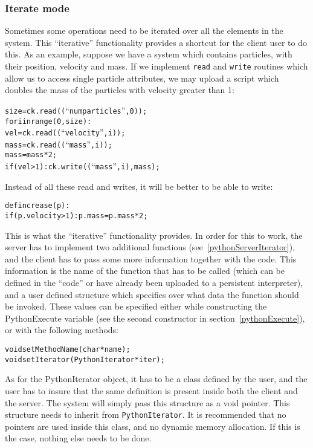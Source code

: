 \subsubsection{Iterate mode}

\label{pythonIterator}

Sometimes some operations need to be iterated over all the elements in the
system. This ``iterative'' functionality provides a shortcut for the client user
to do this. As an example, suppose we have a system which contains particles,
with their position, velocity and mass. If we implement \texttt{read} and
\texttt{write} routines which allow us to access single particle attributes, we may
upload a script which doubles the mass of the particles with velocity greater
than 1:

\begin{alltt}
size = ck.read((``numparticles'', 0));
for i in range(0, size):
    vel = ck.read((``velocity'', i));
    mass = ck.read((``mass'', i));
    mass = mass * 2;
    if (vel > 1): ck.write((``mass'', i), mass);
\end{alltt}

Instead of all these read and writes, it will be better to be able to write:

\begin{alltt}
def increase(p):
    if (p.velocity > 1): p.mass = p.mass * 2;
\end{alltt}

This is what the ``iterative'' functionality provides. In order for this to
work, the server has to implement two additional functions
(see~\ref{pythonServerIterator}), and the client has to pass some more
information together with the code. This information is the name of the function
that has to be called (which can be defined in the ``code'' or have already been
uploaded to a persistent interpreter), and a user defined structure which
specifies over what data the function should be invoked. These values can be
specified either while constructing the PythonExecute variable (see the second
constructor in section~\ref{pythonExecute}), or with the following methods:

\begin{alltt}
void setMethodName(char *name);
void setIterator(PythonIterator *iter);
\end{alltt}

As for the PythonIterator object, it has to be a class defined by the user, and
the user has to insure that the same definition is present inside both the
client and the server. The \charmpp{} system will simply pass this structure as
a void pointer. This structure needs to inherit from \texttt{PythonIterator}. It
is recommended that no pointers are used inside this class, and no dynamic
memory allocation. If this is the case, nothing else needs to be done.

